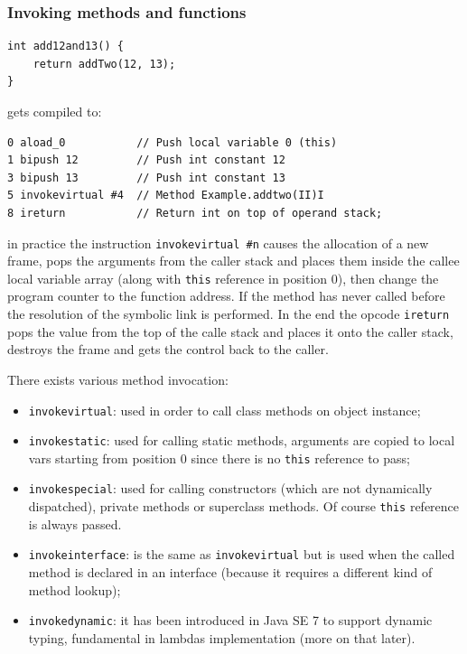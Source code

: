 \subsubsection{Invoking methods and functions}
\begin{verbatim}
int add12and13() {
    return addTwo(12, 13);
}
\end{verbatim}
gets compiled to:
\begin{verbatim}
0 aload_0           // Push local variable 0 (this)
1 bipush 12         // Push int constant 12
3 bipush 13         // Push int constant 13
5 invokevirtual #4  // Method Example.addtwo(II)I
8 ireturn           // Return int on top of operand stack;
\end{verbatim}
in practice the instruction \verb|invokevirtual #n| causes the allocation of a new frame, pops the arguments from the caller stack and places them inside the callee local variable array (along with \verb|this| reference in position 0), then change the program counter to the function address.
If the method has never called before the resolution of the symbolic link is performed.
In the end the opcode \verb|ireturn| pops the value from the top of the calle stack and places it onto the caller stack, destroys the frame and gets the control back to the caller.

There exists various method invocation:
\begin{itemize}
    \item \verb|invokevirtual|: used in order to call class methods on object instance;

    \item \verb|invokestatic|: used for calling static methods, arguments are copied to local vars starting from position 0 since there is no \verb|this| reference to pass; 

    \item \verb|invokespecial|: used for calling constructors (which are not dynamically dispatched), private methods or superclass methods.
    Of course \verb|this| reference is always passed.

    \item \verb|invokeinterface|: is the same as \verb|invokevirtual| but is used when the called method is declared in an interface (because it requires a different kind of method lookup);

    \item \verb|invokedynamic|: it has been introduced in Java SE 7 to support dynamic typing, fundamental in lambdas implementation (more on that later).
\end{itemize}

